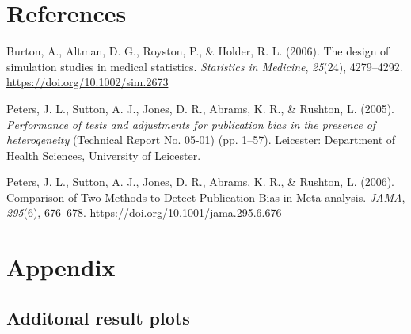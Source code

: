 \documentclass[
  english,
  doc,floatsintext,draftall]{apa6}
\begin{document}
\newpage

\hypertarget{references}{%
\section{References}\label{references}}

\begingroup
\setlength{\parindent}{-0.5in}
\setlength{\leftskip}{0.5in}

\hypertarget{refs}{}
\leavevmode\hypertarget{ref-burton_design_2006}{}%
Burton, A., Altman, D. G., Royston, P., \& Holder, R. L. (2006). The design of simulation studies in medical statistics. \emph{Statistics in Medicine}, \emph{25}(24), 4279--4292. \url{https://doi.org/10.1002/sim.2673}

\leavevmode\hypertarget{ref-peters_performance_2005}{}%
Peters, J. L., Sutton, A. J., Jones, D. R., Abrams, K. R., \& Rushton, L. (2005). \emph{Performance of tests and adjustments for publication bias in the presence of heterogeneity} (Technical Report No. 05-01) (pp. 1--57). Leicester: Department of Health Sciences, University of Leicester.

\leavevmode\hypertarget{ref-peters_comparison_2006}{}%
Peters, J. L., Sutton, A. J., Jones, D. R., Abrams, K. R., \& Rushton, L. (2006). Comparison of Two Methods to Detect Publication Bias in Meta-analysis. \emph{JAMA}, \emph{295}(6), 676--678. \url{https://doi.org/10.1001/jama.295.6.676}

\newpage

\hypertarget{appendix}{%
\section{Appendix}\label{appendix}}

\hypertarget{additonal-result-plots}{%
\subsection{Additonal result plots}\label{additonal-result-plots}}
\end{document}
